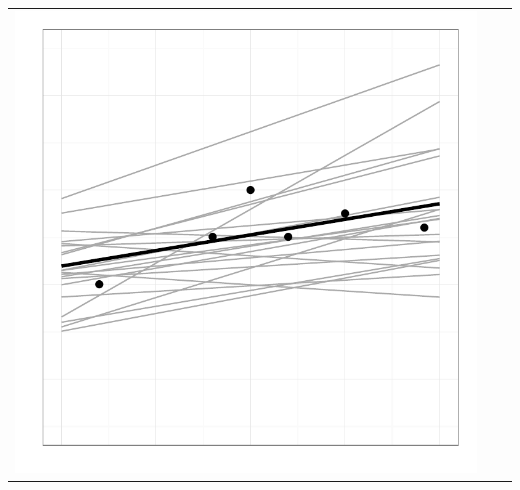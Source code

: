 \documentclass[a4paper,natbib]{apa6}
\begin{document}
\begin{table}[h!]
\begin{tabular}{lcc}
\includegraphics[scale=0.2]{figure2.pdf}\\


\end{tabular}
\end{table}
\end{document}
